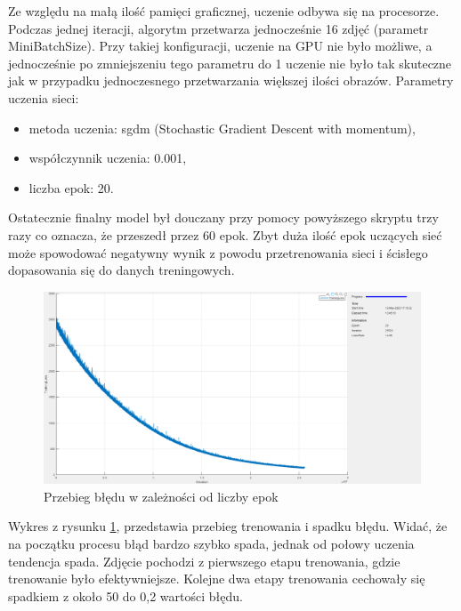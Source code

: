 


Ze względu na małą ilość pamięci graficznej, uczenie odbywa się na procesorze. 
Podczas jednej iteracji, algorytm przetwarza jednocześnie 16 zdjęć (parametr MiniBatchSize). Przy takiej konfiguracji, uczenie 
na GPU nie było możliwe, a jednocześnie po zmniejszeniu tego parametru do 1 uczenie nie było tak skuteczne jak w przypadku jednoczesnego 
przetwarzania większej ilości obrazów.
Parametry uczenia sieci:
\begin{itemize}
	\item metoda uczenia: sgdm (Stochastic Gradient Descent with momentum),
	\item współczynnik uczenia: 0.001,
	\item liczba epok: 20.
\end{itemize}
Ostatecznie finalny model był douczany przy pomocy powyższego skryptu trzy razy co oznacza, że przeszedł przez 60 epok. 
Zbyt duża ilość epok uczących sieć może spowodować negatywny wynik z powodu przetrenowania sieci i ścisłego dopasowania się do danych treningowych.
\begin{figure}[H]
	\centering
	\includegraphics[width=14cm]{pages/uczenie/img/wykresTrenowanie.png}
	\caption{Przebieg błędu w zależności od liczby epok}
	\label{fig:bladWUczeniu}
\end{figure}
Wykres z rysunku \ref{fig:bladWUczeniu}, przedstawia przebieg trenowania i spadku błędu. Widać, że na początku procesu błąd bardzo szybko spada, 
jednak od połowy uczenia tendencja spada. Zdjęcie pochodzi z pierwszego etapu trenowania, gdzie trenowanie było efektywniejsze. 
Kolejne dwa etapy trenowania cechowały się spadkiem z około 50 do 0,2 wartości błędu. 

